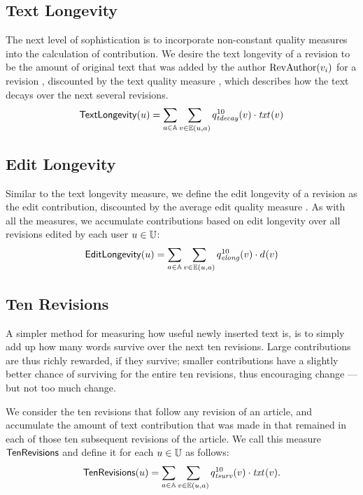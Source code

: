 \subsection{Text Longevity}

\noindent
The next level of sophistication is to incorporate
non-constant quality measures into the calculation of contribution.
We desire the text longevity of a revision to be
the amount of original text that was
added by the author $\mathrm{RevAuthor}(v_{i})$
for a revision , discounted by the
text quality measure , which describes
how the text decays over the next several revisions.
%
\[
\textlong(u) =
\sum_{a \in \articles} \sum_{v \in \authorrevs{u, a}} \quality{tdecay}{10}{v}
        \cdot \txt{}{v}
\]
%

\subsection{Edit Longevity}

\noindent
Similar to the text longevity measure, we define the edit longevity
of a revision  as the edit contribution, discounted by the
average edit quality measure .
As with all the measures, we accumulate contributions based on
edit longevity over all revisions edited by each user $u \in \mathbb{U}$:
%
\[
\editlong(u) = \sum_{a \in \articles} \sum_{v \in \authorrevs{u, a}}
\quality{elong}{10}{v} \cdot \dist{}{v}
\]
%

\subsection{Ten Revisions}

\noindent
A simpler method for measuring how useful newly inserted
text is, is to simply add up how many words survive over
the next ten revisions.
Large contributions are thus richly rewarded, if they survive;
smaller contributions have a slightly better chance of surviving
for the entire ten revisions, thus encouraging change ---
but not too much change.

We consider the ten revisions that follow any revision  of an
article, and accumulate the amount of text contribution that was made
in  that remained in each of those ten subsequent revisions
of the article.
We call this measure $\tenrevs$ and define it for each
$u \in \mathbb{U}$ as follows:
%
\begin{gather*}
\tenrevs(u) =
\sum_{a \in \articles} \sum_{v \in \authorrevs{u, a}} \quality{tsurv}{10}{v}
        \cdot \txt{}{v}.
\end{gather*}

